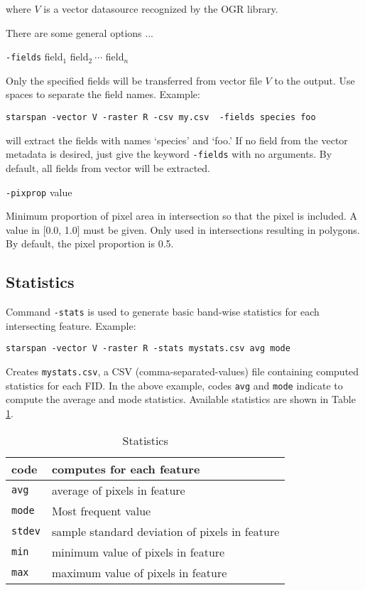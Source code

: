 \documentclass{elsart}
\begin{document}
where $V$ is a vector datasource recognized by the OGR library.

There are some general options ...

	\verb|-fields| field$_1$ field$_2\ \cdots$ field$_n$
	
Only the specified fields will be transferred from vector
file $V$ to the output. Use spaces to separate the field
names. Example:

   \verb|starspan -vector V -raster R -csv my.csv  -fields species foo|

will extract the fields with names `species' and `foo.' If
no field from the vector metadata is desired, just give the
keyword \verb|-fields| with no arguments. By default, all
fields from vector will be extracted.

	\verb|-pixprop| value

Minimum proportion of pixel area in intersection so that the
pixel is included. A value in [0.0, 1.0] must be given. Only
used in intersections resulting in polygons. By default, the
pixel proportion is 0.5.

\subsection{Statistics}

Command \verb|-stats| is used to generate basic band-wise
statistics for each intersecting feature. Example:

	\verb|starspan -vector V -raster R -stats mystats.csv avg mode|

Creates \verb|mystats.csv|, a CSV (comma-separated-values)
file containing computed statistics for each FID. In the
above example, codes \verb|avg| and \verb|mode| indicate to
compute the average and mode statistics. Available
statistics are shown in Table \ref{table-stats}.

\begin{table}[!ht]
\centering
\caption{Statistics}
\begin{tabular}{|l|l|}
\hline 
 code        & computes for each feature\\
\hline
\verb|avg  |  &   average of pixels in feature\\
\verb|mode |  &   Most frequent value\\
\verb|stdev|  &   sample standard deviation of pixels in feature\\
\verb|min  |  &   minimum value of pixels in feature\\
\verb|max  |  &   maximum value of pixels in feature\\
\hline
\end{tabular}
\label{table-stats}
\end{table}
\end{document}
